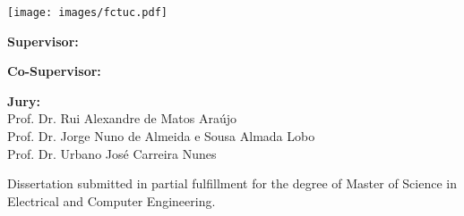 \begin{titlepage}
\begin{center}
\texttt{[image: images/fctuc.pdf]}

\vspace{1cm}
{\huge{\textbf{\thesistitle}}\par}

\vspace{1cm}
{\large{\textbf{Supervisor:}\\\supervisorname\par}}
\vspace{5mm}
{\large{\textbf{Co-Supervisor:}\\\cosupervisorname}}

\vspace{1cm}
{\large{\textbf{Jury:} \\
Prof. Dr. Rui Alexandre de Matos Ara\'{u}jo \\
Prof. Dr. Jorge Nuno de Almeida e Sousa Almada Lobo \\
Prof. Dr. Urbano Jos\'{e} Carreira Nunes
}}

\vfill
Dissertation submitted in partial fulfillment for the degree of Master of Science in Electrical and Computer Engineering.

\vspace{0.5cm}
{\large \statedate\par}    


\end{center}
\end{titlepage}